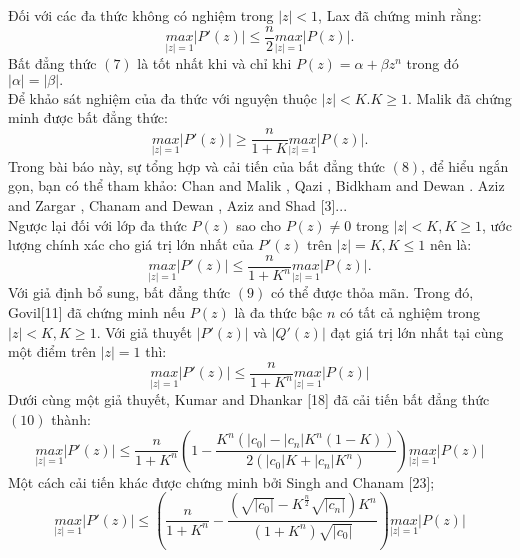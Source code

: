 \documentclass[a5paper,12pt]{report}%
\theoremstyle{definition}
\begin{document}
	Đối với các đa thức không có nghiệm trong $|z|<1$,  Lax\cite{lax1944proof} đã chứng minh rằng:
	\begin{equation} \label{(2)}
		\underset{|z|=1}{max}|P'(z)|  \le \frac{n}{2}\underset{|z|=1}{max}|P(z)|.
	\end{equation}
	Bất đẳng thức $(7)$ là tốt nhất khi và chỉ khi $P(z)=\alpha+ \beta z^n$ trong đó $|\alpha|=|\beta|.$\\
 Để khảo sát nghiệm của đa thức với nguyện thuộc $|z|<K.K \ge 1$. Malik đã chứng minh được bất đẳng thức:
	\begin{equation}\label{(3)}
		\underset{|z|=1}{max}|P'(z)| \ge \frac{n}{1+K}\underset{|z|=1}{max}|P(z)|. 
	\end{equation}
	Trong bài báo này, sự tổng hợp và cải tiến của bất đẳng thức $(8)$, để hiểu ngắn gọn, bạn có thể tham khảo: Chan and Malik \cite{Chan1983OnET}, Qazi \cite{qazi1992maximum}  , Bidkham and Dewan \cite{bidkham1992inequalities}. Aziz and Zargar \cite{AZIZ1988306}, Chanam and Dewan \cite{chanam2007inequalities}, Aziz and Shad [3]...\\
	Ngược lại đối với lớp đa thức $P(z)$ sao cho $P(z)\ne 0$ trong $|z| <K,K \ge 1$, ước lượng chính xác cho giá trị lớn nhất của $P'(z)$ trên $|z|=K,K \le 1$ nên là:
	\begin{equation}\label{(4)}
		\underset{|z|=1}{max}|P'(z)| \le \frac{n}{1+K^n}\underset{|z|=1}{max}|P(z)|.
	\end{equation} 
	Với giả định bổ sung, bất đẳng thức $(9)$ có thể được thỏa mãn. Trong đó, Govil[11] đã chứng minh nếu $P(z)$ là đa thức bậc $n$ có tất cả nghiệm trong $|z|<K,K\ge 1$. Với giả thuyết $|P'(z)|$ và $|Q'(z)|$ đạt giá trị lớn nhất tại cùng một điểm trên $|z|=1$ thì:
	\begin{equation}\label{5}
		\underset{|z|=1}{max}|P'(z)| \le \frac{n}{1+K^n}\underset{|z|=1}{max}|P(z)|   
	\end{equation}
	Dưới cùng một giả thuyết, Kumar and Dhankar [18] đã cải tiến bất đẳng thức $(10)$ thành:
	\begin{equation} \label{6}
		\underset{|z|=1}{max}|P'(z)| \le \frac{n}{1+K^n}\left(1-\frac{K^n(|c_0|-|c_n|K^n(1-K))}{2(|c_0|K+|c_n|K^n)}\right)\underset{|z|=1}{max}|P(z)|
	\end{equation}
	Một cách cải tiến khác được chứng minh bởi  Singh and Chanam [23];
	\begin{equation} \label{7}
		\underset{|z|=1}{max}|P'(z)| \le \left(\frac{n}{1+K^n}-\frac{(\sqrt{|c_0|}-K^{\frac{n}{2}}\sqrt{|c_n|})K^n}{(1+K^n)\sqrt{|c_0|}}\right)\underset{|z|=1}{max}|P(z)| 
	\end{equation}
\end{document}
